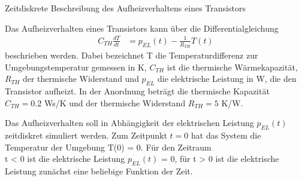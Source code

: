 \begin{example}{Zeitdiskrete Beschreibung des Aufheizverhaltens eines Transistors}
\label{example:beispiel-zeitdiskrete-beschreibung-des-aufheizverhaltens-eines-transistors}

Das Aufheizverhalten eines Transistors kann über die Differentialgleichung
\begin{align*}
C_{TH}  \frac{dT}{dt} &= p_{EL}(t) - \frac{1}{R_{TH}}  T(t) 
\end{align*}
beschrieben werden. Dabei bezeichnet T die Temperaturdifferenz zur Umgebungstemperatur gemessen in K, \(C_{TH}\) ist die thermische Wärmekapazität, \(R_{TH}\) der thermische Widerstand und \(p_{EL}\) die elektrische Leistung in W, die den Transistor aufheizt. In der Anordnung beträgt die thermische Kapazität\\
\(C_{TH} = 0.2\) Ws/K und der thermische Widerstand \(R_{TH} = 5\) K/W.

Das Aufheizverhalten soll in Abhängigkeit der elektrischen Leistung \(p_{EL}(t)\) zeitdiskret simuliert werden. Zum Zeitpunkt \(t = 0\) hat das System die Temperatur der Umgebung T(0) = 0. Für den Zeitraum\\
t \textless{} 0 ist die elektrische Leistung \(p_{EL}(t)\) = 0, für t \textgreater{} 0 ist die elektrische Leistung zunächst eine beliebige Funktion der Zeit.


\end{example}
